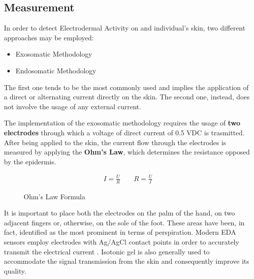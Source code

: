 \subsection{Measurement}\label{subsec:eda-measurement}


In order to detect Electrodermal Activity on and individual's skin, two different approaches may be employed:

\begin{itemize}
    \item Exosomatic Methodology
    \item Endosomatic Methodology
\end{itemize}

The first one tends to be the most commonly used and implies the application of a direct or alternating current directly on the skin. The second one, instead, does not involve the usage of any external current.

The implementation of the exosomatic methodology requires the usage of \textbf{two electrodes} through which a voltage of direct current of 0.5 VDC is trasmitted. After being applied to the skin, the current flow through the electrodes is measured by applying the \textbf{Ohm's Law}, which determines the resistance opposed by the epidermis.

\begin{figure}[h]
    \begin{equation}
    \begin{aligned}
    I = \frac{U}{R} \; \; \; \; \; \; \; R = \frac{U}{I}
    \end{aligned}
    \end{equation}
    \caption{Ohm's Law Formula}
    \label{fig:ohmlaw}
\end{figure}

It is important to place both the electrodes on the palm of the hand, on two adjacent fingers or, otherwise, on the sole of the foot. These areas have been, in fact, identified as the most prominent in terms of perspiration. Modern EDA sensors employ electrodes with Ag/AgCl contact points in order to accurately transmit the electrical current \cite{eda-imotions}. Isotonic gel is also generally used to accommodate the signal transmission from the skin and consequently improve its quality.

